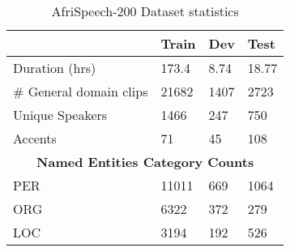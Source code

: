 \documentclass{INTERSPEECH2023}
\begin{document}
\begin{table}[h]
\centering
\small
\caption{AfriSpeech-200 Dataset statistics}
\begin{tabular}{l|l|l|l}
\toprule 
& Train & Dev & Test\\
\midrule
Duration (hrs) & 173.4  &  8.74 & 18.77  \\
\# General domain clips & 21682  &  1407 & 2723  \\
Unique Speakers & 1466   &  247 & 750 \\
Accents & 71 &  45 & 108 \\
\hline
\multicolumn{4}{c}{\textbf{Named Entities Category Counts}}\\
\hline
PER & 11011 &  669 & 1064  \\
ORG & 6322 &  372 & 279 \\
LOC & 3194 &  192 & 526  \\
\bottomrule
\end{tabular}
\label{tab: dataset stats}
\end{table}
\end{document}

